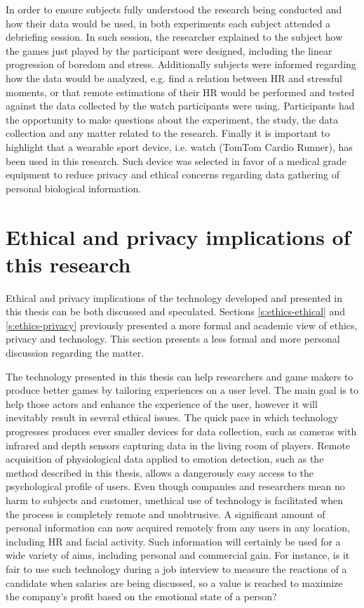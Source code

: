 In order to ensure subjects fully understood the research being conducted and how their data would be used, in both experiments each subject attended a debriefing session. In such session, the researcher explained to the subject how the games just played by the participant were designed, including the linear progression of boredom and stress. Additionally subjects were informed regarding how the data would be analyzed, e.g. find a relation between HR and stressful moments, or that remote estimations of their HR would be performed and tested against the data collected by the watch participants were using. Participants had the opportunity to make questions about the experiment, the study, the data collection and any matter related to the research. Finally it is important to highlight that a wearable sport device, i.e. watch (TomTom Cardio Runner), has been used in this research. Such device was selected in favor of a medical grade equipment to reduce privacy and ethical concerns regarding data gathering of personal biological information.

\section{Ethical and privacy implications of this research}
\label{s:ethics-this-research}

Ethical and privacy implications of the technology developed and presented in this thesis can be both discussed and speculated. Sections \ref{s:ethics-ethical} and \ref{s:ethics-privacy} previously presented a more formal and academic view of ethics, privacy and technology. This section presents a less formal and more personal discussion regarding the matter.

The technology presented in this thesis can help researchers and game makers to produce better games by tailoring experiences on a user level. The main goal is to help those actors and enhance the experience of the user, however it will inevitably result in several ethical issues. The quick pace in which technology progresses produces ever smaller devices for data collection, such as cameras with infrared and depth sensors capturing data in the living room of players. Remote acquisition of physiological data applied to emotion detection, such as the method described in this thesis, allows a dangerously easy access to the psychological profile of users. Even though companies and researchers mean no harm to subjects and customer, unethical use of technology is facilitated when the process is completely remote and unobtrusive. A significant amount of personal information can now acquired remotely from any users in any location, including HR and facial activity. Such information will certainly be used for a wide variety of aims, including personal and commercial gain. For instance, is it fair to use such technology during a job interview to measure the reactions of a candidate when salaries are being discussed, so a value is reached to maximize the company's profit based on the emotional state of a person?

